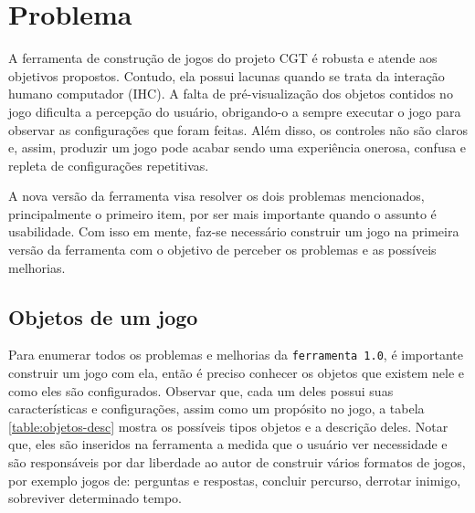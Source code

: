 \documentclass[12pt,twoside,openright,a4paper,english,brazil,sumario=tradicional]{abntex2}
\begin{document}
\chapter{Problema}
\label{chap:problemas}
A ferramenta de construção de jogos do projeto CGT é robusta e atende aos objetivos propostos. Contudo, ela possui lacunas quando se trata da interação humano computador (IHC). A falta de pré-visualização dos objetos contidos no jogo dificulta a percepção do usuário, obrigando-o a sempre executar o jogo para observar as configurações que foram feitas. Além disso, os controles não são claros e, assim, produzir um jogo pode acabar sendo uma experiência onerosa, confusa e repleta de configurações repetitivas.

A nova versão da ferramenta visa resolver os dois problemas mencionados, principalmente o primeiro item, por ser mais importante quando o assunto é usabilidade. Com isso em mente, faz-se necessário construir um jogo na primeira versão da ferramenta com o objetivo de perceber os problemas e as possíveis melhorias.

\section{Objetos de um jogo}
\label{sec:objetos}

Para enumerar todos os problemas e melhorias da \texttt{ferramenta 1.0}, é importante construir um jogo com ela, então é preciso conhecer os objetos que existem nele e como eles são configurados. Observar que, cada um deles possui suas características e configurações, assim como um propósito no jogo, a tabela \ref{table:objetos-desc} mostra os possíveis tipos objetos e a descrição deles. Notar que, eles são inseridos na ferramenta a medida que o usuário ver necessidade e são responsáveis por dar liberdade ao autor de construir vários formatos de jogos, por exemplo jogos de: perguntas e respostas, concluir percurso, derrotar inimigo, sobreviver determinado tempo.
\end{document}
